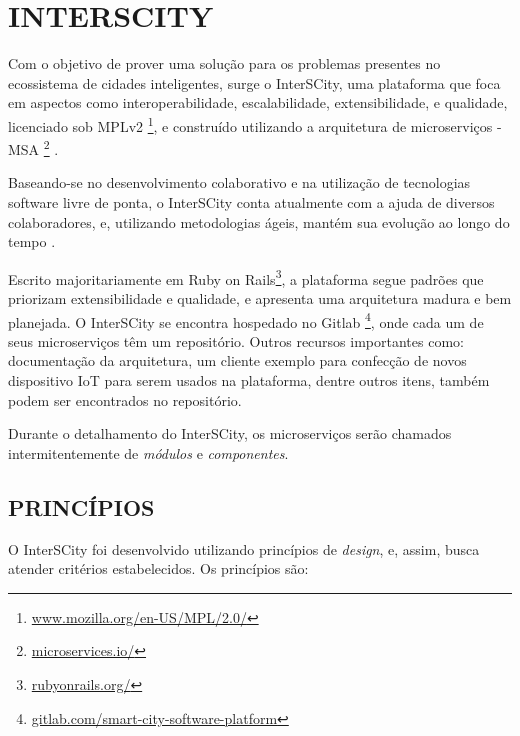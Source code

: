 \chapter[INTERSCITY]{INTERSCITY}
\label{chapter:interscity}

Com o objetivo de prover uma solução para os problemas presentes no ecossistema
de cidades inteligentes, surge o InterSCity, uma plataforma que foca em
aspectos como interoperabilidade, escalabilidade, extensibilidade, e qualidade,
licenciado sob
MPLv2 \footnote{\url{www.mozilla.org/en-US/MPL/2.0/}}, e construído
utilizando a arquitetura de microserviços -
MSA \footnote{\url{microservices.io/}} \cite{delesposte2017}.

Baseando-se no desenvolvimento colaborativo e na utilização de tecnologias
software livre de ponta, o InterSCity conta atualmente com a ajuda de diversos
colaboradores, e, utilizando metodologias ágeis, mantém sua evolução ao longo
do tempo \cite{delesposte2017}.

Escrito majoritariamente em Ruby on Rails\footnote{\url{rubyonrails.org/}},
a plataforma segue padrões que priorizam extensibilidade e qualidade, e
apresenta uma arquitetura madura e bem planejada. O InterSCity se encontra
hospedado no Gitlab \footnote{\url{gitlab.com/smart-city-software-platform}},
onde cada um de seus microserviços têm um repositório. Outros recursos
importantes como: documentação da arquitetura, um cliente exemplo para
confecção de novos dispositivo IoT para serem usados na plataforma, dentre
outros itens, também podem ser encontrados no repositório.

Durante o detalhamento do InterSCity, os microserviços serão chamados
intermitentemente de \textit{módulos} e \textit{componentes}. %

\section{PRINCÍPIOS}

O InterSCity foi desenvolvido utilizando princípios de \textit{design}, e,
assim, busca atender critérios estabelecidos. Os princípios são:

